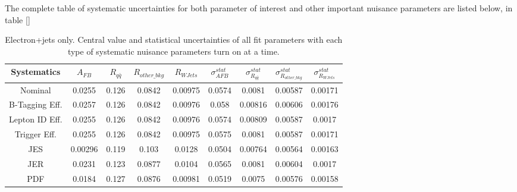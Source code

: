 \documentclass{cmspaperpdf}
\begin{document}
The complete table of systematic uncertainties for both parameter of interest and other important nuisance parameters are listed below, in table []

\begin{table}[htb]
\centering
\label{tab:el-sys-full}
\begin{tabular}{ccccccccc}
Systematics &      $A_{FB}$ &   $R_{q\bar{q}}$ & $R_{other\_bkg}$ &  $R_{WJets}$ & $\sigma_{AFB}^{stat}$ & $\sigma_{R_{q\bar{q}}}^{stat}$ & $\sigma_{R_{other\_bkg}}^{stat}$ & $\sigma_{R_{WJets}}^{stat}$ \\
\hline
Nominal           &   0.0255 &  0.126 &      0.0842 &  0.00975 &       0.0574 &        0.0081 &              0.00587 &          0.00171 \\
\hline
B-Tagging Eff. &   0.0257 &  0.126 &      0.0842 &  0.00976 &        0.058 &       0.00816 &              0.00606 &          0.00176 \\
Lepton ID Eff.    &   0.0255 &  0.126 &      0.0842 &  0.00976 &       0.0574 &       0.00809 &              0.00587 &           0.0017 \\
Trigger Eff.  &   0.0255 &  0.126 &      0.0842 &  0.00975 &       0.0575 &        0.0081 &              0.00587 &          0.00171 \\
\hline
JES               &  0.00296 &  0.119 &       0.103 &   0.0128 &       0.0504 &       0.00764 &              0.00564 &          0.00163 \\
JER               &   0.0231 &  0.123 &      0.0877 &   0.0104 &       0.0565 &        0.0081 &              0.00604 &           0.0017 \\
PDF       &   0.0184 &  0.127 &      0.0876 &  0.00981 &       0.0519 &        0.0075 &              0.00576 &          0.00158 \\
\hline
\end{tabular}
\caption{Electron+jets only. Central value and statistical uncertainties of all fit parameters with each type of systematic nuisance parameters turn on at a time.}
\end{table}
\end{document}
